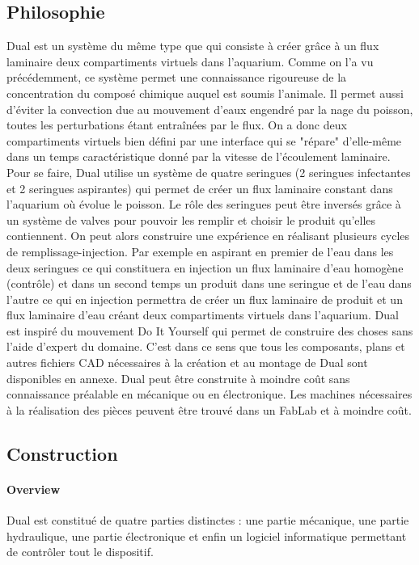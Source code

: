   \subsection{Philosophie}
  Dual est un système du même type que \cite{readman2013fish} qui consiste à créer grâce à un flux laminaire deux compartiments virtuels dans l'aquarium. Comme on l'a vu précédemment, ce système permet une connaissance rigoureuse de la concentration du composé chimique auquel est soumis l'animale. Il permet aussi d'éviter la convection due au mouvement d'eaux engendré par la nage du poisson, toutes les perturbations étant entraînées par le flux. On a donc deux compartiments virtuels bien défini par une interface qui se "répare" d'elle-même dans un temps caractéristique donné par la vitesse de l'écoulement laminaire. 
  \medbreak
  Pour se faire, Dual utilise un système de quatre seringues (2 seringues infectantes et 2 seringues aspirantes) qui permet de créer un flux laminaire constant dans l'aquarium où évolue le poisson. Le rôle des seringues peut être inversés grâce à un système de valves pour pouvoir les remplir et choisir le produit qu'elles contiennent. On peut alors construire une expérience en réalisant plusieurs cycles de remplissage-injection. Par exemple en aspirant en premier de l'eau dans les deux seringues ce qui constituera en injection un flux laminaire d'eau homogène (contrôle) et dans un second temps un produit dans une seringue et de l'eau dans l'autre ce qui en injection permettra de créer un flux laminaire de produit et un flux laminaire d'eau créant deux compartiments virtuels dans l'aquarium. 
  \medbreak
  Dual est inspiré du mouvement Do It Yourself qui permet de construire des choses sans l'aide d'expert du domaine. C'est dans ce sens que tous les composants, plans et autres fichiers CAD nécessaires à la création et au montage de Dual sont disponibles en annexe. Dual peut être construite à moindre coût sans connaissance préalable en mécanique ou en électronique. Les machines nécessaires à la réalisation des pièces peuvent être trouvé dans un FabLab et à moindre coût.
  \subsection{Construction}
  \paragraph{Overview}
  Dual est constitué de quatre parties distinctes : une partie mécanique, une partie hydraulique, une partie électronique et enfin un logiciel informatique permettant de contrôler tout le dispositif.

